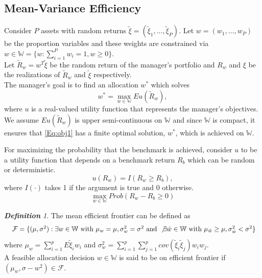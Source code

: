 \documentclass[12pt,oneside,a4paper]{book}
\theoremstyle{definition}
\theoremstyle{remark}
\newtheorem{defn}{\bf Definition}[subsection]
\begin{document}
			\subsection{Mean-Variance Efficiency}
				Consider $P$ assets with random returns $\tilde{\xi} = (\tilde{\xi}_1,\dots,\tilde{\xi}_P)$. Let $w=(w_1,\dots,w_P)$ be the proportion variables and these weights are constrained via $w\in \mathbb{W}= \{w:\sum_{i=1}^{P}w_i=1,w\ge 0\}$.\\
				Let $\tilde{R}_w = w^T\tilde{\xi}$ be the random return of the manager's portfolio and $R_w$ and $\xi$ be the realizations of $\tilde{R}_w$ and $\tilde{\xi}$ respectively.\\
				The manager's goal is to find an allocation $w^*$ which solves
				\begin{equation}\label{Eq:obj1}
					w^* = \max_{w\in\mathbb{W}	} Eu(\tilde{R}_w),
				\end{equation}
				where $u$ is a real-valued utility function that represents the manager's objectives.\\

				We assume $Eu(\tilde{R}_w)$ is upper semi-continuous on $\mathbb{W}$ and since $\mathbb{W}$ is compact, it ensures that \eqref{Eq:obj1} has a finite optimal solution, $w^*$, which is achieved on $\mathbb{W}$.

				For maximizing the probability that the benchmark is achieved, consider $u$ to be a utility function that depends on a benchmark return $R_b$ which can be random or deterministic.
				\begin{equation}\label{Eq:utilfunc}
					u(R_w) = I(R_w \ge R_b),
				\end{equation}
				where $I(\cdot)$ takes 1 if the argument is true and 0 otherwise.\\


				\begin{equation}\label{Eq:maxProb2}
					\max_{w\in\mathbb{W}}Prob(R_w-R_b \ge 0)
				\end{equation}

				\begin{defn}\label{dfn:mean-var}
					The mean efficient frontier can be defined as
					\begin{equation*}\label{Eq:mean-eff}
						\resizebox{\hsize}{!}{
							$\mathcal{F} = \{
							(\mu,\sigma^2) :
							\exists w\in \mathbb{W} \text{ with }  \mu_w=\mu, \sigma_w^2=\sigma^2 \text{ and }
							\not\exists \hat{w}\in \mathbb{W} \text{ with }  \mu_{\hat{w}} \ge \mu, \sigma_{\hat{w}}^2 < \sigma^2
							\}
							$}
					\end{equation*} where $\mu_w = \sum_{i=1}^{p}E\tilde{\xi}_i w_i$ and $\sigma_w^2 = \sum_{i=1}^{p}\sum_{j=1}^{p} cov(\tilde{\xi}_i \tilde{\xi}_j)w_i w_j$. \\
					A feasible allocation decision $w\in\mathbb{W}$ is said to be on efficient frontier if $(\mu_w,\sigma-w^2) \in \mathcal{F}$.
				\end{defn}
\end{document}
